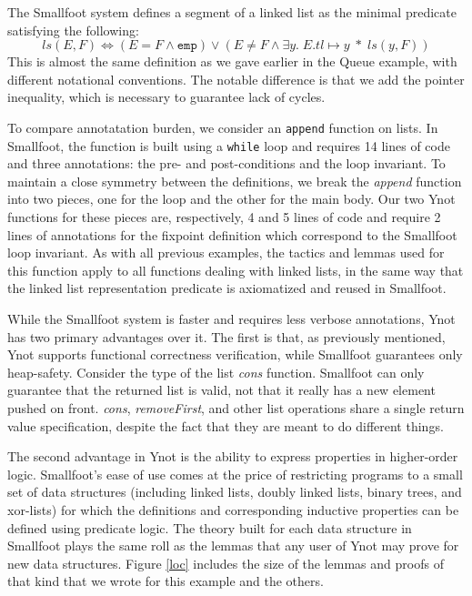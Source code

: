 \documentclass[preprint,nocopyrightspace]{sigplanconf}
\begin{document}
{The Smallfoot system defines a segment of a linked list as the minimal
predicate satisfying the following:
$$
ls(E,F) \Leftrightarrow (E = F \wedge \mathtt{emp}) \vee (E \neq F \wedge \exists y. \; E.tl \mapsto y \; * \; ls(y,F))
$$
This is almost the same definition as we gave earlier in the Queue example, with different notational conventions.  The notable difference is that we add the pointer inequality, which is necessary to guarantee lack of cycles.

To compare annotatation burden, we consider an {\tt append} function
on lists. In Smallfoot, the function is
built using a {\tt while} loop and requires 14 lines of code and three
annotations: the pre- and post-conditions and the loop invariant. To
maintain a close symmetry between the definitions, we break the {\it
append} function into two pieces, one for the loop and the other for
the main body. Our two Ynot functions for these pieces are,
respectively, 4 and 5 lines of code and require 2 lines of annotations
for the fixpoint definition which correspond to the Smallfoot loop
invariant. As with all previous examples, the tactics and lemmas used
for this function apply to all functions dealing with linked lists, in
the same way that the linked list representation predicate is
axiomatized and reused in Smallfoot.

While the Smallfoot system is faster and requires less verbose
annotations, Ynot has two primary advantages over it. The first is
that, as previously mentioned, Ynot supports functional correctness
verification, while Smallfoot guarantees only heap-safety. Consider
the type of the list {\it cons} function.  Smallfoot can only
guarantee that the returned list is valid, not that it really has a
new element pushed on front.  {\it cons}, {\it removeFirst}, and other
list operations share a single return value specification, despite the
fact that they are meant to do different things.

The second advantage in Ynot is the ability to express properties in
higher-order logic. Smallfoot's ease of use comes at the price of
restricting programs to a small set of data structures (including
linked lists, doubly linked lists, binary trees, and xor-lists) for which the
definitions and corresponding inductive properties can be defined
using predicate logic. The theory built for each data structure in
Smallfoot plays the same roll as the lemmas that any user of
Ynot may prove for new data structures.  Figure \ref{loc} includes the
size of the lemmas and proofs of that kind that we wrote for this
example and the others.

}
\end{document}

